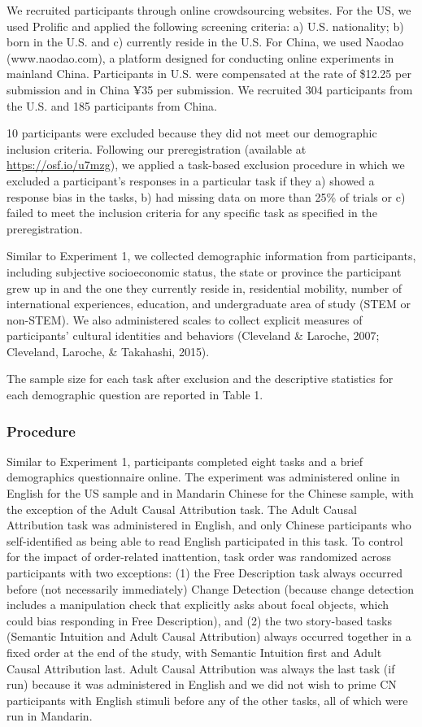 \documentclass[
  man,floatsintext]{apa6}
\begin{document}
We recruited participants through online crowdsourcing websites. For the US, we used Prolific and applied the following screening criteria: a) U.S. nationality; b) born in the U.S. and c) currently reside in the U.S. For China, we used Naodao (www.naodao.com), a platform designed for conducting online experiments in mainland China. Participants in U.S. were compensated at the rate of \$12.25 per submission and in China ¥35 per submission. We recruited 304 participants from the U.S. and 185 participants from China.

10 participants were excluded because they did not meet our demographic inclusion criteria. Following our preregistration (available at \url{https://osf.io/u7mzg}), we applied a task-based exclusion procedure in which we excluded a participant's responses in a particular task if they a) showed a response bias in the tasks, b) had missing data on more than 25\% of trials or c) failed to meet the inclusion criteria for any specific task as specified in the preregistration.

Similar to Experiment 1, we collected demographic information from participants, including subjective socioeconomic status, the state or province the participant grew up in and the one they currently reside in, residential mobility, number of international experiences, education, and undergraduate area of study (STEM or non-STEM). We also administered scales to collect explicit measures of participants' cultural identities and behaviors (Cleveland \& Laroche, 2007; Cleveland, Laroche, \& Takahashi, 2015).

The sample size for each task after exclusion and the descriptive statistics for each demographic question are reported in Table 1.

\hypertarget{procedure-1}{%
\subsubsection{Procedure}\label{procedure-1}}

Similar to Experiment 1, participants completed eight tasks and a brief demographics questionnaire online. The experiment was administered online in English for the US sample and in Mandarin Chinese for the Chinese sample, with the exception of the Adult Causal Attribution task. The Adult Causal Attribution task was administered in English, and only Chinese participants who self-identified as being able to read English participated in this task. To control for the impact of order-related inattention, task order was randomized across participants with two exceptions: (1) the Free Description task always occurred before (not necessarily immediately) Change Detection (because change detection includes a manipulation check that explicitly asks about focal objects, which could bias responding in Free Description), and (2) the two story-based tasks (Semantic Intuition and Adult Causal Attribution) always occurred together in a fixed order at the end of the study, with Semantic Intuition first and Adult Causal Attribution last. Adult Causal Attribution was always the last task (if run) because it was administered in English and we did not wish to prime CN participants with English stimuli before any of the other tasks, all of which were run in Mandarin.
\end{document}
